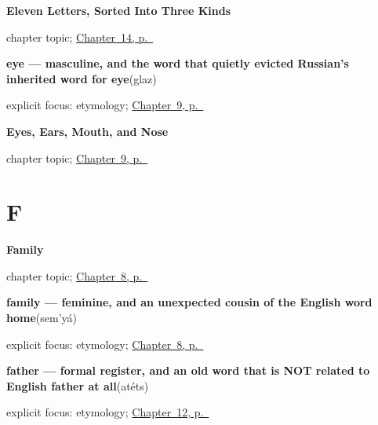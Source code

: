 \noindent\begin{minipage}[t]{\linewidth}
\raggedright
\textbf{Eleven Letters, Sorted Into Three Kinds}\par
\footnotesize chapter topic; \hyperref[ch:ru-script-eleven]{Chapter~14, p.~\pageref*{ch:ru-script-eleven}}
\end{minipage}\par\smallskip

\noindent\begin{minipage}[t]{\linewidth}
\raggedright
\textbf{eye — masculine, and the word that quietly evicted Russian's inherited word for eye}\enspace\emph{}\enspace(glaz)\par
\footnotesize explicit focus: etymology; \hyperref[ch:russian-face-parts]{Chapter~9, p.~\pageref*{ch:russian-face-parts}}
\end{minipage}\par\smallskip

\noindent\begin{minipage}[t]{\linewidth}
\raggedright
\textbf{Eyes, Ears, Mouth, and Nose}\par
\footnotesize chapter topic; \hyperref[ch:russian-face-parts]{Chapter~9, p.~\pageref*{ch:russian-face-parts}}
\end{minipage}\par\smallskip

\section*{F}

\noindent\begin{minipage}[t]{\linewidth}
\raggedright
\textbf{Family}\par
\footnotesize chapter topic; \hyperref[ch:russian-family]{Chapter~8, p.~\pageref*{ch:russian-family}}
\end{minipage}\par\smallskip

\noindent\begin{minipage}[t]{\linewidth}
\raggedright
\textbf{family — feminine, and an unexpected cousin of the English word home}\enspace\emph{}\enspace(sem'yá)\par
\footnotesize explicit focus: etymology; \hyperref[ch:russian-family]{Chapter~8, p.~\pageref*{ch:russian-family}}
\end{minipage}\par\smallskip

\noindent\begin{minipage}[t]{\linewidth}
\raggedright
\textbf{father — formal register, and an old word that is NOT related to English father at all}\enspace\emph{}\enspace(atéts)\par
\footnotesize explicit focus: etymology; \hyperref[ch:russian-mother-and-father]{Chapter~12, p.~\pageref*{ch:russian-mother-and-father}}
\end{minipage}\par\smallskip

